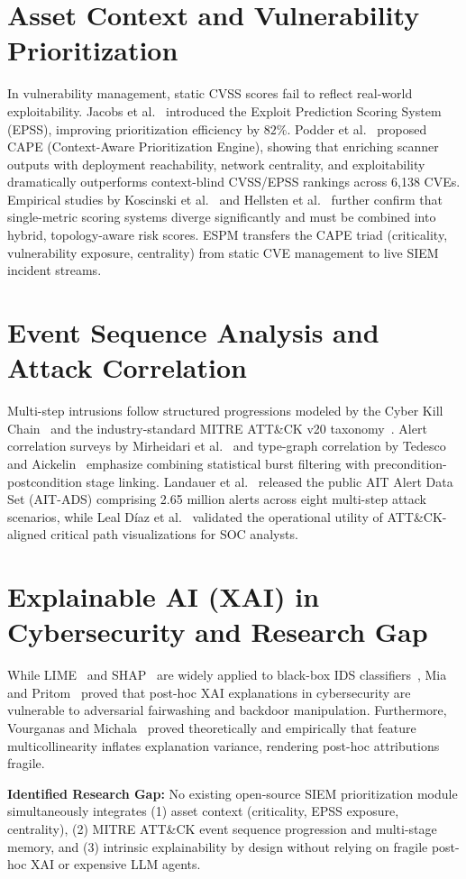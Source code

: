 \section{Asset Context and Vulnerability Prioritization}
In vulnerability management, static CVSS scores fail to reflect real-world exploitability. Jacobs et al.~\cite{Jacobs2019, Jacobs2023} introduced the Exploit Prediction Scoring System (EPSS), improving prioritization efficiency by $82\%$. Podder et al.~\cite{Podder2026} proposed CAPE (Context-Aware Prioritization Engine), showing that enriching scanner outputs with deployment reachability, network centrality, and exploitability dramatically outperforms context-blind CVSS/EPSS rankings across 6,138 CVEs. Empirical studies by Koscinski et al.~\cite{Koscinski2025} and Hellsten et al.~\cite{Hellsten2026} further confirm that single-metric scoring systems diverge significantly and must be combined into hybrid, topology-aware risk scores. ESPM transfers the CAPE triad (criticality, vulnerability exposure, centrality) from static CVE management to live SIEM incident streams.

\section{Event Sequence Analysis and Attack Correlation}
Multi-step intrusions follow structured progressions modeled by the Cyber Kill Chain~\cite{Hutchins2011} and the industry-standard MITRE ATT\&CK v20 taxonomy~\cite{MITRE2026}. Alert correlation surveys by Mirheidari et al.~\cite{Mirheidari2013} and type-graph correlation by Tedesco and Aickelin~\cite{Tedesco2010} emphasize combining statistical burst filtering with precondition-postcondition stage linking. Landauer et al.~\cite{Landauer2023} released the public AIT Alert Data Set (AIT-ADS) comprising 2.65 million alerts across eight multi-step attack scenarios, while Leal D\'iaz et al.~\cite{LealDiaz2023} validated the operational utility of ATT\&CK-aligned critical path visualizations for SOC analysts.

\section{Explainable AI (XAI) in Cybersecurity and Research Gap}
While LIME~\cite{Ribeiro2016} and SHAP~\cite{Lundberg2017} are widely applied to black-box IDS classifiers~\cite{Kalakoti2025}, Mia and Pritom~\cite{Mia2025} proved that post-hoc XAI explanations in cybersecurity are vulnerable to adversarial fairwashing and backdoor manipulation. Furthermore, Vourganas and Michala~\cite{Vourganas2026} proved theoretically and empirically that feature multicollinearity inflates explanation variance, rendering post-hoc attributions fragile.

\textbf{Identified Research Gap:} No existing open-source SIEM prioritization module simultaneously integrates (1) asset context (criticality, EPSS exposure, centrality), (2) MITRE ATT\&CK event sequence progression and multi-stage memory, and (3) intrinsic explainability by design without relying on fragile post-hoc XAI or expensive LLM agents.
